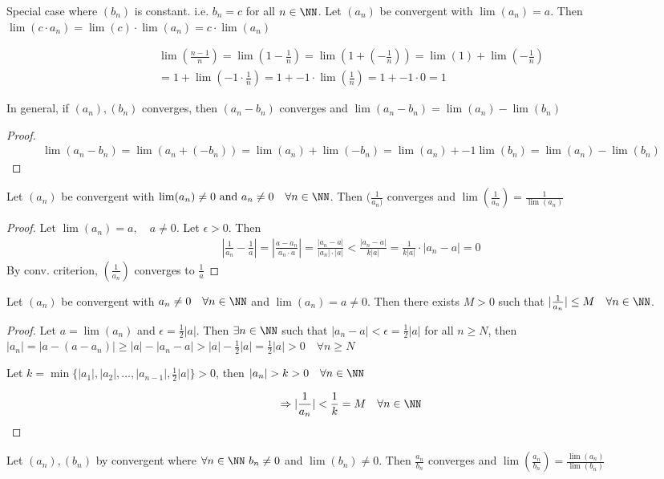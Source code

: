 \documentclass[class=scrartcl, crop=false]{standalone}
\begin{document}
\begin{note}
  Special case where $(b_n)$ is constant. i.e. $b_n = c$ for all $n \in \NN$. Let $(a_n)$ be convergent with $\lim(a_n) = a$. Then $\lim(c \cdot a_n) = \lim(c) \cdot \lim(a_n) = c \cdot \lim(a_n)$
\end{note}

\begin{example}
  \begin{gather*}
    \lim(\frac{n - 1}{n}) = \lim(1 - \frac{1}{n}) = \lim(1 + (-\frac{1}{n})) = \lim(1) + \lim(-\frac{1}{n}) \\
    = 1 + \lim(-1 \cdot \frac{1}{n}) = 1 + -1 \cdot \lim(\frac{1}{n}) = 1 + -1 \cdot 0 = 1
  \end{gather*}
\end{example}

\begin{theorem}
  In general, if $(a_n), (b_n)$ converges, then $(a_n - b_n)$ converges and $\lim(a_n - b_n) = \lim(a_n) - \lim(b_n)$
   \begin{proof}
     \begin{gather*}
       \lim(a_n - b_n) = \lim(a_n + (-b_n)) = \lim(a_n) + \lim(-b_n) = \lim(a_n) + -1\lim(b_n) = \lim(a_n) - \lim(b_n)
     \end{gather*}
  \end{proof}
\end{theorem}

\begin{theorem}
  Let $(a_n)$ be convergent with $\lim(a_n) \neq 0 \ \text{and} \ a_n \neq 0 \quad \forall n \in \NN$. Then $(\frac{1}{a_n)}$ converges and $\lim(\frac{1}{a_n}) = \frac{1}{\lim(a_n)}$
  \begin{proof}
    Let $\lim(a_n) = a, \quad a \neq 0.$ Let $\epsilon > 0$. Then
    \begin{gather*}
    |\frac{1}{a_n} - \frac{1}{a}| = |\frac{a - a_n}{a_n \cdot a}| = \frac{|a_n - a|}{|a_n|\cdot|a|} < \frac{|a_n - a|}{k|a|} = \frac{1}{k|a|} \cdot |a_n - a| = 0
    \end{gather*}
    By conv. criterion, $(\frac{1}{a_n})$ converges to $\frac{1}{a}$
  \end{proof}
  \begin{lemma}
    Let $(a_n)$ be convergent with $a_n \neq 0 \quad \forall n \in \NN$ and $\lim(a_n) = a \neq 0$. Then there exists $M > 0$ such that $|\frac{1}{a_n}| \leq M \quad \forall n \in \NN$.
    \begin{proof}
      Let $a = \lim(a_n)$ and $\epsilon = \frac{1}{2}|a|$. Then $\exists n \in \NN$ such that $|a_n - a| < \epsilon = \frac{1}{2}|a|$ for all $n \geq N$, then $|a_n| = |a - (a - a_n)| \geq |a| - |a_n - a| > |a| - \frac{1}{2}|a| = \frac{1}{2}|a| > 0 \quad \forall n \geq N$

      Let $k = \min\{|a_1|,|a_2|,\dots,|a_{n - 1}|,\frac{1}{2}|a|\} > 0$, then $|a_n| > k > 0 \quad \forall n \in \NN$

      \[
        \Rightarrow |\frac{1}{a_n}| < \frac{1}{k} = M \quad \forall n \in \NN
      \]
    \end{proof}
  \end{lemma}
\end{theorem}

\begin{theorem}
  Let $(a_n), (b_n)$ by convergent where $\forall n \in \NN \ b_n \neq 0$ and $\lim(b_n) \neq 0$. Then $\frac{a_n}{b_n}$ converges and $\lim(\frac{a_n}{b_n}) = \frac{\lim(a_n)}{\lim(b_n)}$
\end{theorem}
\end{document}
